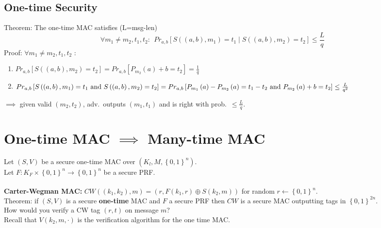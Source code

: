 \documentclass[a4paper]{article}
\begin{document}
	\subsection{One-time Security}
	Theorem: The one-time MAC satisfies  (L=msg-len)\\
	\[
		\forall m_1 \neq m_2,t_1,t_2:\ \ Pr_{a,b}\left[ S\left( \left( a,b \right) ,m_1 \right) =t_1
		\mid S\left( \left( a,b \right) ,m_2 \right) =t_2 \right] \le \frac{L}{q}
	\]
	Proof: $\forall m_1\neq m_2,t_1,t_2$ :
	\begin{enumerate}
		\item $Pr_{a,b}\left[ S\left( \left( a,b \right) ,m_2 \right) =t_2 \right] =Pr_{a,b}\left[ P_{m_2}\left( a \right) +b=t_2 \right] =\frac{1}{q} $
		\item $Pr_{a,b}\left[ S\left( \left( a,b \right) ,m_1 \right) =t_1 \text{ and } S\left( \left( a,b \right) ,m_2 \right) =t_2\right] =\\Pr_{a,b}\left[ P_{m_1}\left( a \right) -P_{m_2}\left( a \right) =t_1-t_2 \text{ and } P_{m_2}\left( a \right) +b=t_2 \right] \le \frac{L}{q^2}$
	\end{enumerate}
	$\implies$ given valid $\left( m_2,t_2 \right) $, adv.\ outputs $\left( m_1,t_1 \right) $ and is right with prob.\ $\le \frac{L}{q}$.

	\section{One-time MAC $\implies$ Many-time MAC}
	Let $\left( S,V \right) $ be a secure one-time MAC over $\left( K_l,M,\left\{ 0,1 \right\}^{n}  \right) $.\\
	Let $F:K_F \times \left\{ 0,1 \right\}^{n} \to \left\{ 0,1 \right\}^{n} $ be a secure PRF.\\
	\\
	\textbf{Carter-Wegman MAC:} $CW\left( \left( k_1,k_2 \right) ,m \right) = \left( r,F\left( k_1,r \right) \oplus S\left( k_2,m \right)  \right) $ for random $r \leftarrow \left\{ 0,1 \right\}^{n} $.\\
	Theorem: if $\left( S,V \right) $ is a secure \textbf{one-time} MAC and $F$ a secure PRF
	then $CW$ is a secure MAC outputting tags in $\left\{ 0,1 \right\}^{2n} $.\\
	How would you verify a CW tag $\left( r,t \right)$ on message $m$?\\
	Recall that $V\left( k_2,m,\cdot  \right) $ is the verification algorithm for the
	one time MAC.
\end{document}
